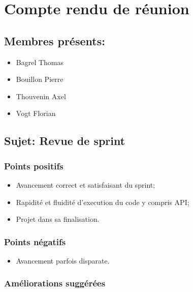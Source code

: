 \documentclass[a4paper, 12pt]{report}
\begin{document}

\section{Compte rendu de réunion }

\subsection*{Membres présents:}

\begin{itemize}

\item
  Bagrel Thomas
\item
  Bouillon Pierre
\item
  Thouvenin Axel
\item
  Vogt Florian
\end{itemize}

\subsection*{Sujet: Revue de sprint }

\subsubsection*{Points positifs}

\begin{itemize}

\item
  Avancement correct et satisfaisant du sprint;
\item
  Rapidité et fluidité d'execution du code y compris API;
\item
  Projet dans sa finalisation.
\end{itemize}

\subsubsection*{Points négatifs}

\begin{itemize}

\item
  Avancement parfois disparate.
\end{itemize}

\subsubsection*{Améliorations suggérées}
\end{document}
